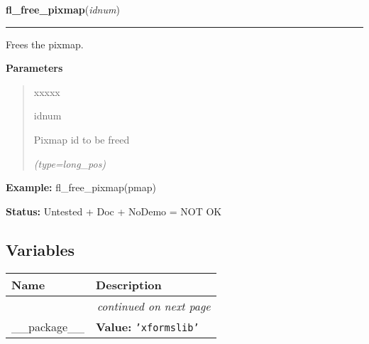 \hspace{.8\funcindent}\begin{boxedminipage}{\funcwidth}

    \raggedright \textbf{fl\_free\_pixmap}(\textit{idnum})

    \vspace{-1.5ex}

    \rule{\textwidth}{0.5\fboxrule}
\setlength{\parskip}{2ex}
    Frees the pixmap.

\setlength{\parskip}{1ex}
      \textbf{Parameters}
      \vspace{-1ex}

      \begin{quote}
        \begin{Ventry}{xxxxx}

          \item[idnum]

          Pixmap id to be freed

            {\it (type=long\_pos)}

        \end{Ventry}

      \end{quote}

\textbf{Example:} fl\_free\_pixmap(pmap)



\textbf{Status:} Untested + Doc + NoDemo = NOT OK



    \end{boxedminipage}



  \subsection{Variables}

    \vspace{-1cm}
\hspace{\varindent}\begin{longtable}{|p{\varnamewidth}|p{\vardescrwidth}|l}
\cline{1-2}
\cline{1-2} \centering \textbf{Name} & \centering \textbf{Description}& \\
\cline{1-2}
\endhead\cline{1-2}\multicolumn{3}{r}{\small\textit{continued on next page}}\\\endfoot\cline{1-2}
\endlastfoot\raggedright \_\-\_\-p\-a\-c\-k\-a\-g\-e\-\_\-\_\- & \raggedright \textbf{Value:} 
{\tt \texttt{'}\texttt{xformslib}\texttt{'}}&\\
\cline{1-2}
\end{longtable}

